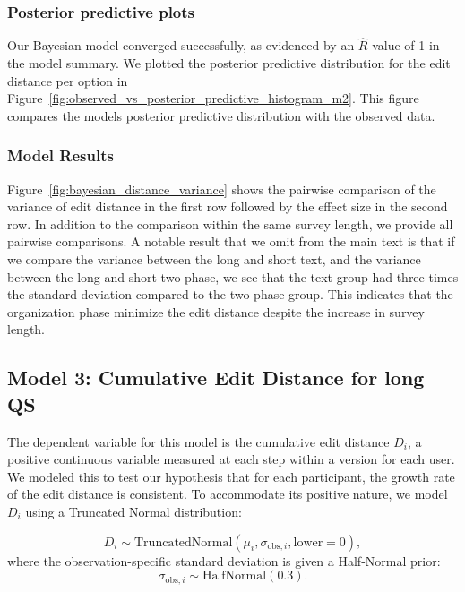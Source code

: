 \subsubsection{Posterior predictive plots}
Our Bayesian model converged successfully, as evidenced by an $\hat{R}$ value of 1 in the model summary. We plotted the posterior predictive distribution for the edit distance per option in Figure~\ref{fig:observed_vs_posterior_predictive_histogram_m2}. This figure compares the models posterior predictive distribution with the observed data.

\subsubsection{Model Results}
Figure~\ref{fig:bayesian_distance_variance} shows the pairwise comparison of the variance of edit distance in the first row followed by the effect size in the second row. In addition to the comparison within the same survey length, we provide all pairwise comparisons. A notable result that we omit from the main text is that if we compare the variance between the long and short text, and the variance between the long and short two-phase, we see that the text group had three times the standard deviation compared to the two-phase group. This indicates that the organization phase minimize the edit distance despite the increase in survey length.

\subsection{Model 3: Cumulative Edit Distance for long QS} \label{sec:apdx:model_cum_distance}

The dependent variable for this model is the cumulative edit distance $D_i$, a positive continuous variable measured at each step within a version for each user. We modeled this to test our hypothesis that for each participant, the growth rate of the edit distance is consistent. To accommodate its positive nature, we model $D_i$ using a Truncated Normal distribution:

\begin{equation}\label{eq:model3_likelihood}
D_i \sim \text{TruncatedNormal}(\mu_i, \sigma_{\text{obs},i}, \text{lower}=0),
\end{equation}
where the observation-specific standard deviation is given a Half-Normal prior:
\begin{equation}\label{eq:model3_prior_sigma}
\sigma_{\text{obs},i} \sim \text{HalfNormal}(0.3).
\end{equation}

